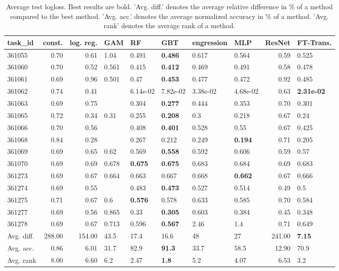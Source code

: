 \begin{table}[ht!]
\centering
\begingroup\footnotesize
\begin{tabular}{lrrlllllrl}
  \hline
\hline
task\_id & const. & log. reg. & GAM & RF & GBT & engression & MLP & ResNet & FT-Trans. \\ 
  \hline
361055 & 0.70 & 0.61 & 1.04 & 0.491 & \textbf{0.486} & 0.617 & 0.564 & 0.59 & 0.525 \\ 
  361060 & 0.70 & 0.52 & 0.561 & 0.415 & \textbf{0.412} & 0.469 & 0.491 & 0.58 & 0.478 \\ 
  361061 & 0.69 & 0.96 & 0.501 & 0.47 & \textbf{0.453} & 0.477 & 0.472 & 0.92 & 0.485 \\ 
  361062 & 0.74 & 0.41 &  & 6.14e-02 & 7.82e-02 & 3.38e-02 & 4.68e-02 & 0.63 & \textbf{2.31e-02} \\ 
  361063 & 0.69 & 0.75 &  & 0.304 & \textbf{0.277} & 0.444 & 0.353 & 0.70 & 0.301 \\ 
  361065 & 0.72 & 0.34 & 0.31 & 0.255 & \textbf{0.208} & 0.3 & 0.218 & 0.67 & 0.24 \\ 
  361066 & 0.70 & 0.56 &  & 0.408 & \textbf{0.401} & 0.528 & 0.55 & 0.67 & 0.425 \\ 
  361068 & 0.84 & 0.28 &  & 0.267 & 0.212 & 0.249 & \textbf{0.194} & 0.71 & 0.205 \\ 
  361069 & 0.69 & 0.65 & 0.62 & 0.569 & \textbf{0.558} & 0.592 & 0.606 & 0.59 & 0.57 \\ 
  361070 & 0.69 & 0.69 & 0.678 & \textbf{0.675} & \textbf{0.675} & 0.683 & 0.684 & 0.69 & 0.683 \\ 
  361273 & 0.69 & 0.67 & 0.664 & 0.663 & 0.667 & 0.668 & \textbf{0.662} & 0.67 & 0.666 \\ 
  361274 & 0.69 & 0.55 &  & 0.483 & \textbf{0.473} & 0.527 & 0.514 & 0.49 & 0.5 \\ 
  361275 & 0.71 & 0.67 & 0.6 & \textbf{0.576} & 0.578 & 0.633 & 0.585 & 0.70 & 0.584 \\ 
  361277 & 0.69 & 0.56 & 0.865 & 0.33 & \textbf{0.305} & 0.603 & 0.384 & 0.45 & 0.348 \\ 
  361278 & 0.69 & 0.67 & 0.713 & 0.596 & \textbf{0.567} & 2.46 & 1.4 & 0.71 & 0.649 \\ 
   \hline
Avg. diff. & 288.00 & 154.00 & 43.5 & 17.4 & 16.6 & 48 & 27 & 241.00 & \textbf{7.15} \\ 
  Avg. acc. & 0.86 & 6.01 & 31.7 & 82.9 & \textbf{91.3} & 33.7 & 58.5 & 12.90 & 70.9 \\ 
  Avg. rank & 8.00 & 6.60 & 6.2 & 2.47 & \textbf{1.8} & 5.2 & 4.07 & 6.53 & 3.2 \\ 
   \hline
\hline
\end{tabular}
\endgroup
\caption{Average test logloss. 
                  Best results are bold. 
                  'Avg. diff.' denotes the average relative difference in \% of a method compared to the best method.
                  'Avg. acc.' denotes the average normalized accuracy in \% of a method.
                  'Avg. rank' denotes the average rank of a method.} 
\label{TABLES/table_results_logloss_umap}
\end{table}
